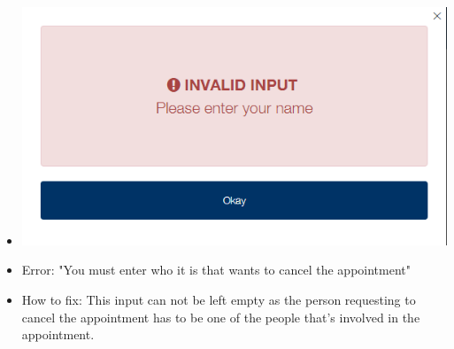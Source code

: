 \begin{itemize}
\begin{itemize}
				\item \includegraphics[width=\linewidth]{images/Screenshots/Errors/NotLoggedIn/AppointName.png}
				\item Error: "You must enter who it is that wants to cancel the appointment"
				\item How to fix: This input can not be left empty as the person requesting to cancel the appointment has to be one of the people that's involved in the appointment.
			\end{itemize}
	\end{itemize}